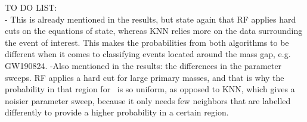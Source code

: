 
TO DO LIST:
\\

- This is already mentioned in the results, but state again that RF applies hard cuts on the equations of state, whereas KNN relies more on the data surrounding the event of interest. This makes the probabilities from both algorithms to be different when it comes to classifying events located around the mass gap, e.g. GW190824. 
-Also mentioned in the results: the differences in the parameter sweeps. RF applies a hard cut for large primary masses, and that is why the probability in that region for \hasns\ is so uniform, as opposed to KNN, which gives a noisier parameter sweep, because it only needs few neighbors that are labelled differently to provide a higher probability in a certain region.  \\
